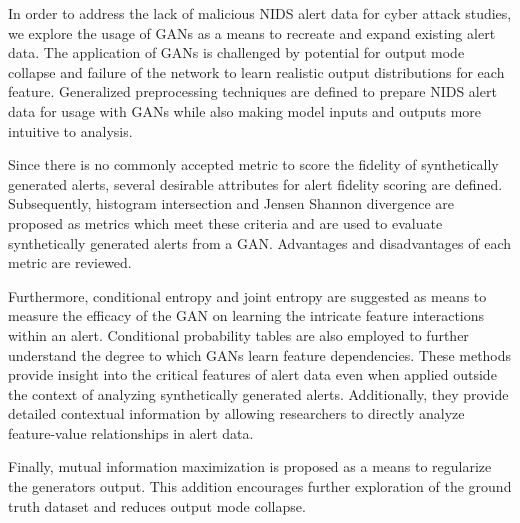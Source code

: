 In order to address the lack of malicious NIDS alert data for cyber attack studies, we explore the usage of GANs as a means to recreate and expand existing alert data. The application of GANs is challenged by potential for output mode collapse and failure of the network to learn realistic output distributions for each feature. Generalized preprocessing techniques are defined to prepare NIDS alert data for usage with GANs while also making model inputs and outputs more intuitive to analysis. 

Since there is no commonly accepted metric to score the fidelity of synthetically generated alerts, several desirable attributes for alert fidelity scoring are defined. Subsequently, histogram intersection and Jensen Shannon divergence are proposed as metrics which meet these criteria and are used to evaluate synthetically generated alerts from a GAN. Advantages and disadvantages of each metric are reviewed. 

Furthermore, conditional entropy and joint entropy are suggested as means to measure the efficacy of the GAN on learning the intricate feature interactions within an alert. Conditional probability tables are also employed to further understand the degree to which GANs learn feature dependencies. These methods provide insight into the critical features of alert data even when applied outside the context of analyzing synthetically generated alerts. Additionally, they provide detailed contextual information by allowing researchers to directly analyze feature-value relationships in alert data. 

Finally, mutual information maximization is proposed as a means to regularize the generators output. This addition encourages further exploration of the ground truth dataset and reduces output mode collapse.  


